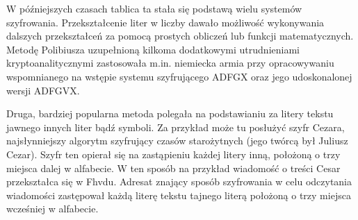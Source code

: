 \documentclass[a4paper]{article}
\begin{document}
\noindent W późniejszych czasach tablica ta stała się podstawą wielu systemów szyfrowania. Przekształcenie
liter w liczby dawało możliwość wykonywania dalszych przekształceń za pomocą prostych obliczeń
lub funkcji matematycznych. Metodę Polibiusza uzupełnioną kilkoma dodatkowymi utrudnieniami
kryptoanalitycznymi zastosowała m.in. niemiecka armia przy opracowywaniu wspomnianego na
wstępie systemu szyfrującego ADFGX oraz jego udoskonalonej wersji ADFGVX. 

\noindent Druga, bardziej popularna metoda polegała na podstawianiu za litery tekstu jawnego innych liter
bądź symboli. Za przykład może tu posłużyć szyfr Cezara, najsłynniejszy algorytm szyfrujący
czasów starożytnych (jego twórcą był Juliusz Cezar). Szyfr ten opierał się na zastąpieniu każdej
litery inną, położoną o trzy miejsca dalej w alfabecie. W ten sposób na przykład wiadomość o treści
Cesar przekształca się w Fhvdu. Adresat znający sposób szyfrowania w celu odczytania wiadomości
zastępował każdą literę tekstu tajnego literą położoną o trzy miejsca wcześniej w alfabecie.
\end{document}
